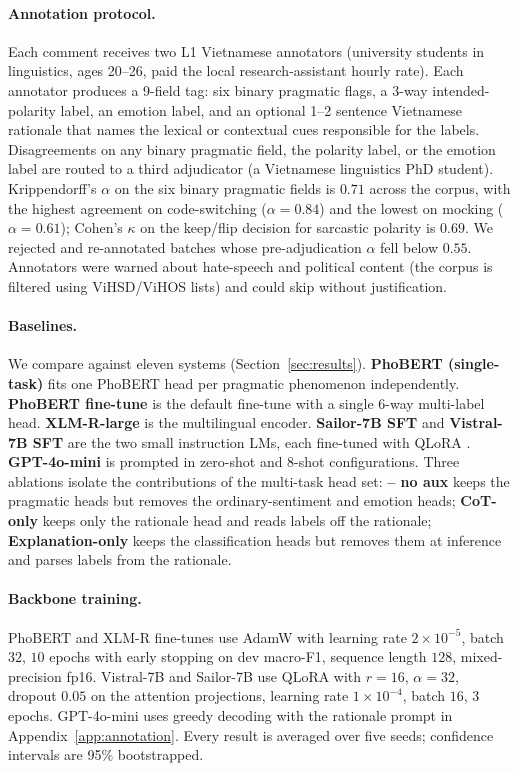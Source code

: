 \paragraph{Annotation protocol.}
Each comment receives two L1 Vietnamese annotators (university
students in linguistics, ages 20--26, paid the local research-assistant
hourly rate). Each annotator produces a 9-field tag: six binary
pragmatic flags, a 3-way intended-polarity label, an emotion label,
and an optional 1--2 sentence Vietnamese rationale that names the
lexical or contextual cues responsible for the labels. Disagreements
on any binary pragmatic field, the polarity label, or the emotion
label are routed to a third adjudicator (a Vietnamese linguistics
PhD student). Krippendorff's $\alpha$ on the six binary pragmatic
fields is $0.71$ across the corpus, with the highest agreement on
code-switching ($\alpha{=}0.84$) and the lowest on mocking
($\alpha{=}0.61$); Cohen's $\kappa$ on the keep/flip decision for
sarcastic polarity is $0.69$. We rejected and re-annotated batches
whose pre-adjudication $\alpha$ fell below $0.55$. Annotators were
warned about hate-speech and political content (the corpus is
filtered using ViHSD/ViHOS lists)
\citep{vihsd2021,vihos2023} and could skip without justification.

\paragraph{Baselines.}
We compare against eleven systems (Section~\ref{sec:results}).
\textbf{PhoBERT (single-task)} fits one PhoBERT head per pragmatic
phenomenon independently. \textbf{PhoBERT fine-tune} is the default
fine-tune with a single 6-way multi-label head. \textbf{XLM-R-large}
\citep{conneau2020xlmr} is the multilingual encoder. \textbf{Sailor-7B
SFT} \citep{sailor2024} and \textbf{Vistral-7B SFT} \citep{vistral2024}
are the two small instruction LMs, each fine-tuned with
QLoRA \citep{hu2022lora,dettmers2023qlora}.
\textbf{GPT-4o-mini} \citep{openai2024gpt4o} is prompted in zero-shot
and 8-shot configurations. Three ablations isolate the contributions
of the multi-task head set: \textbf{\method{} -- no aux} keeps the
pragmatic heads but removes the ordinary-sentiment and emotion heads;
\textbf{CoT-only} keeps only the rationale head and reads labels off
the rationale; \textbf{Explanation-only} keeps the classification
heads but removes them at inference and parses labels from the
rationale.

\paragraph{Backbone training.}
PhoBERT and XLM-R fine-tunes use AdamW \citep{loshchilov2019adamw}
with learning rate $2{\times}10^{-5}$, batch $32$, $10$ epochs with
early stopping on dev macro-F1, sequence length $128$, mixed-precision
fp16. Vistral-7B and Sailor-7B use QLoRA with $r{=}16$,
$\alpha{=}32$, dropout $0.05$ on the attention projections, learning
rate $1{\times}10^{-4}$, batch $16$, $3$ epochs. GPT-4o-mini uses
greedy decoding with the rationale prompt in
Appendix~\ref{app:annotation}. Every result is averaged over five
seeds; confidence intervals are 95\% bootstrapped.

